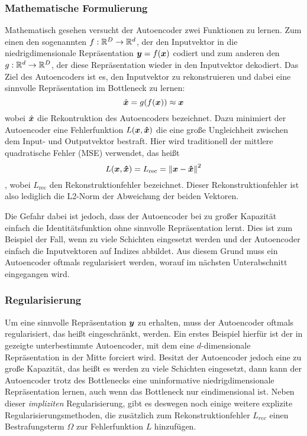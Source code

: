 \subsubsection{Mathematische Formulierung}
\label{ch:MethodenDerDimRed:ML:AE:MathematischeFormulierung}
Mathematisch gesehen versucht der Autoencoder zwei Funktionen zu lernen. Zum einen den sogenannten  $f: \mathbb{R}^D \rightarrow \mathbb{R}^d$, der den Inputvektor in die niedrigdimensionale Repräsentation $\bm{y} = f(\bm{x})$ codiert und zum anderen den  $g: \mathbb{R}^d \rightarrow \mathbb{R}^D$, der diese Repräsentation wieder in den Inputvektor dekodiert. Das Ziel des Autoencoders ist es, den Inputvektor zu rekonstruieren und dabei eine sinnvolle Repräsentation im Bottleneck zu lernen:
\begin{equation}
	\hat{\bm{x}} = g(f(\bm{x})) \approx \bm{x}
\end{equation}
wobei $\hat{\bm{x}}$ die Rekontruktion des Autoencoders bezeichnet.
Dazu minimiert der Autoencoder eine Fehlerfunktion $L(\bm{x}, \bm{\hat{x}})$ die eine große Ungleichheit zwischen dem Input- und Outputvektor bestraft. Hier wird traditionell der mittlere quadratische Fehler (MSE) verwendet, das heißt
\begin{equation}
	L(\bm{x}, \bm{\hat{x}}) = L_{\text{rec}} = \left\lVert\bm{x} - \bm{\hat{x}}\right\rVert^2
\end{equation}
\parencite[507]{Goodfellow.2016}, wobei $L_{\text{rec}}$ den Rekonstruktionfehler bezeichnet. Dieser
Rekonstruktionfehler ist also lediglich die L2-Norm der Abweichung der beiden Vektoren.

Die Gefahr dabei ist jedoch, dass der Autoencoder bei zu großer Kapazität einfach die
Identitätsfunktion ohne sinnvolle Repräsentation lernt. Dies ist zum Beispiel der Fall, wenn zu
viele Schichten eingesetzt werden und der Autoencoder einfach die Inputvektoren auf Indizes
abbildet. Aus diesem Grund muss ein Autoencoder oftmals regularisiert werden, worauf im nächsten
Unterabschnitt eingegangen wird.

\subsubsection{Regularisierung}

Um eine sinnvolle Repräsentation $\bm{y}$ zu erhalten, muss der Autoencoder oftmals
regularisiert, das heißt eingeschränkt, werden. Ein erstes Beispiel hierfür ist der in
 gezeigte unterbestimmte Autoencoder, mit dem eine $d$-dimensionale
Repräsentation in der Mitte forciert wird. Besitzt der Autoencoder jedoch eine zu große Kapazität,
das heißt es werden zu viele Schichten eingesetzt, dann kann der Autoencoder trotz des Bottlenecks
eine uninformative niedrigdimensionale Repräsentation lernen, auch wenn das Bottleneck nur
eindimensional ist. Neben dieser \textit{impliziten} Regularisierung, gibt es deswegen noch einige
weitere explizite Regularisierungsmethoden, die zusätzlich zum Rekonstruktionfehler $L_{rec}$ einen
Bestrafungsterm $\Omega$ zur Fehlerfunktion $L$ hinzufügen.

